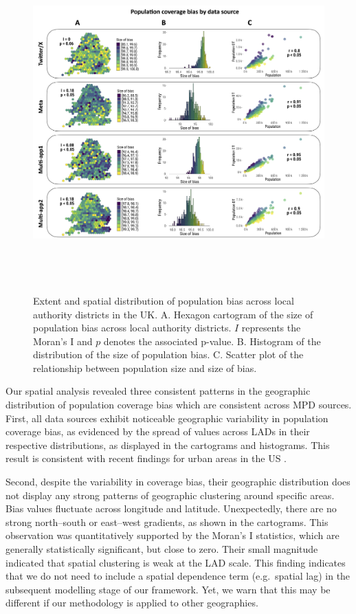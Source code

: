 \documentclass[]{rsos}%
\begin{document}
\begin{figure}
\centering
\includegraphics[width=14cm,height=13cm]{figures/Fig-size-bias.png}
\caption{Extent and spatial distribution of population bias across local
authority districts in the UK. A. Hexagon cartogram of the size of population
bias across local authority districts. \(I\) represents the Moran's I
and \(p\) denotes the associated p-value. B. Histogram of the
distribution of the size of population bias. C. Scatter plot of the
relationship between population size and size of
bias.}\label{fig:bias-size}
\end{figure}

Our spatial analysis revealed three consistent patterns in the geographic distribution of population coverage bias which are consistent across MPD sources. First, all data sources exhibit noticeable geographic
variability in population coverage bias, as evidenced by the spread of values across LADs in
their respective distributions, as displayed in the cartograms and histograms. This result is consistent with recent findings for urban areas in the US \citep{nijs2025}.

Second, despite the variability in coverage bias, their geographic distribution does not
display any strong patterns of geographic clustering around specific areas. Bias values fluctuate across longitude and latitude. Unexpectedly, there are no strong north--south or
east--west gradients, as shown in the cartograms. This observation was quantitatively supported by
the Moran's I statistics, which are generally statistically significant,
but close to zero. Their small magnitude indicated that spatial
clustering is weak at the LAD scale. This finding indicates that we do not need to include a spatial dependence term (e.g.~spatial lag) in
the subsequent modelling stage of our framework. Yet, we warn that this may be different if our methodology is applied to other geographies.
\end{document}
